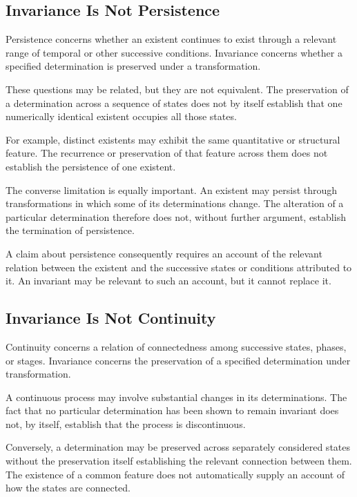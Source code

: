 \subsection{Invariance Is Not Persistence}

Persistence concerns whether an existent continues to exist
through a relevant range of temporal or other successive
conditions. Invariance concerns whether a specified
determination is preserved under a transformation.

These questions may be related, but they are not equivalent.
The preservation of a determination across a sequence of
states does not by itself establish that one numerically
identical existent occupies all those states.

For example, distinct existents may exhibit the same
quantitative or structural feature. The recurrence or
preservation of that feature across them does not establish
the persistence of one existent.

The converse limitation is equally important. An existent
may persist through transformations in which some of its
determinations change. The alteration of a particular
determination therefore does not, without further argument,
establish the termination of persistence.

A claim about persistence consequently requires an account
of the relevant relation between the existent and the
successive states or conditions attributed to it. An invariant
may be relevant to such an account, but it cannot replace it.

\subsection{Invariance Is Not Continuity}

Continuity concerns a relation of connectedness among
successive states, phases, or stages. Invariance concerns
the preservation of a specified determination under
transformation.

A continuous process may involve substantial changes in
its determinations. The fact that no particular determination
has been shown to remain invariant does not, by itself,
establish that the process is discontinuous.

Conversely, a determination may be preserved across
separately considered states without the preservation
itself establishing the relevant connection between them.
The existence of a common feature does not automatically
supply an account of how the states are connected.


